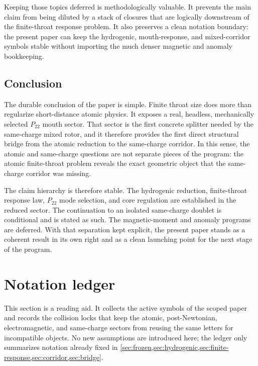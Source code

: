 \documentclass[11pt]{article}
\theoremstyle{plain}
\theoremstyle{definition}
\theoremstyle{remark}
\newcommand{\Ptwotwo}{P_{22}}
\begin{document}
Keeping those topics deferred is methodologically valuable. It prevents the main claim from being diluted by a stack of closures that are logically downstream of the finite-throat response problem. It also preserves a clean notation boundary: the present paper can keep the hydrogenic, mouth-response, and mixed-corridor symbols stable without importing the much denser magnetic and anomaly bookkeeping.

\subsection{Conclusion}\label{subsec:discussion-conclusion}

The durable conclusion of the paper is simple. Finite throat size does more than regularize short-distance atomic physics. It exposes a real, headless, mechanically selected \(\Ptwotwo\) mouth sector. That sector is the first concrete splitter needed by the same-charge mixed rotor, and it therefore provides the first direct structural bridge from the atomic reduction to the same-charge corridor. In this sense, the atomic and same-charge questions are not separate pieces of the program: the atomic finite-throat problem reveals the exact geometric object that the same-charge corridor was missing.

The claim hierarchy is therefore stable. The hydrogenic reduction, finite-throat response law, \(\Ptwotwo\) mode selection, and core regulation are established in the reduced sector. The continuation to an isolated same-charge doublet is conditional and is stated as such. The magnetic-moment and anomaly programs are deferred. With that separation kept explicit, the present paper stands as a coherent result in its own right and as a clean launching point for the next stage of the program.

\appendix

\section{Notation ledger}\label{sec:notation-ledger}

This section is a reading aid. It collects the active symbols of the scoped paper and records the collision locks that keep the atomic, post-Newtonian, electromagnetic, and same-charge sectors from reusing the same letters for incompatible objects. No new assumptions are introduced here; the ledger only summarizes notation already fixed in \cref{sec:frozen,sec:hydrogenic,sec:finite-response,sec:corridor,sec:bridge}.
\end{document}
